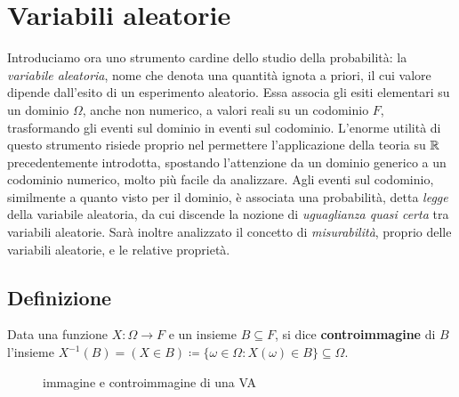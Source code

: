 \section{Variabili aleatorie}
Introduciamo ora uno strumento cardine dello studio della probabilità: la \emph{variabile aleatoria}, nome che denota una quantità ignota a priori, il cui valore dipende dall'esito di un esperimento aleatorio.
Essa associa gli esiti elementari su un dominio $\Omega$, anche non numerico, a valori reali su un codominio $F$, trasformando gli eventi sul dominio in eventi sul codominio.
L'enorme utilità di questo strumento risiede proprio nel permettere l'applicazione della teoria su $\mathbb R$ precedentemente introdotta, spostando l'attenzione da un dominio generico a un codominio numerico, molto più facile da analizzare.
Agli eventi sul codominio, similmente a quanto visto per il dominio, è associata una probabilità, detta \emph{legge} della variabile aleatoria, da cui discende la nozione di \emph{uguaglianza quasi certa} tra variabili aleatorie.
Sarà inoltre analizzato il concetto di \emph{misurabilità}, proprio delle variabili aleatorie, e le relative proprietà.

\subsection{Definizione}

\begin{defn}
   Data una funzione $X: \Omega \to F$ e un insieme $B \subseteq F$, si dice \textbf{controimmagine} di $B$ l'insieme
   $X^{-1}(B) = (X \in B) \coloneqq \{ \omega \in \Omega: X(\omega) \in B\} \subseteq \Omega$.
\end{defn}

\begin{figure}[H]
  \centering
  \def\firstcircle{(0,0) circle (1.2cm)}
  \def\drect {(-1.5, -1.5) rectangle (1.5, 1.5)}
  \caption{immagine e controimmagine di una VA}
\end{figure}

